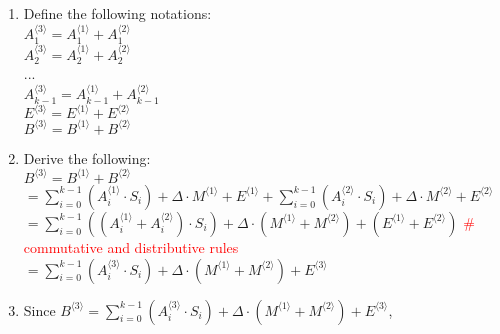 $ $

\begin{myproof}
\begin{enumerate}
\item Define the following notations: \\
$A_1^{\langle 3 \rangle} = A_1^{\langle 1 \rangle} + A_1^{\langle 2 \rangle}$ \\
$A_2^{\langle 3 \rangle} = A_2^{\langle 1 \rangle} + A_2^{\langle 2 \rangle}$ \\
... \\
$A_{k-1}^{\langle 3 \rangle} = A_{k-1}^{\langle 1 \rangle} + A_{k-1}^{\langle 2 \rangle}$ \\
$E^{\langle 3 \rangle} = E^{\langle 1 \rangle} + E^{\langle 2 \rangle}$ \\
$B^{\langle 3 \rangle} = B^{\langle 1 \rangle} + B^{\langle 2 \rangle}$
\item Derive the following: \\
$B^{\langle 3 \rangle} = B^{\langle 1 \rangle} + B^{\langle 2 \rangle}$ \\
$ = \sum\limits_{i=0}^{k-1}{(A_i^{\langle 1 \rangle} \cdot S_i)} + \Delta \cdot M^{\langle 1 \rangle} + E^{\langle 1 \rangle} + \sum\limits_{i=0}^{k-1}{(A_i^{\langle 2 \rangle} \cdot S_i)} + \Delta \cdot M^{\langle 2 \rangle} + E^{\langle 2 \rangle}$ \\ 
$= \sum\limits_{i=0}^{k-1}{((A_i^{\langle 1 \rangle} + A_i^{\langle 2 \rangle}) \cdot S_i)} + \Delta \cdot (M^{\langle 1 \rangle} + M^{\langle 2 \rangle}) + (E^{\langle 1 \rangle} + E^{\langle 2 \rangle})$ \textcolor{red}{\# commutative and distributive rules} \\
$= \sum\limits_{i=0}^{k-1}{(A_i^{\langle 3 \rangle} \cdot S_i)} + \Delta \cdot (M^{\langle 1 \rangle} + M^{\langle 2 \rangle}) + E^{\langle 3 \rangle}$ \\
\item Since $B^{\langle 3 \rangle} = \sum\limits_{i=0}^{k-1}{(A_i^{\langle 3 \rangle} \cdot S_i)} + \Delta \cdot (M^{\langle 1 \rangle} + M^{\langle 2 \rangle}) + E^{\langle 3 \rangle}$, 


\end{enumerate}
\end{myproof}
